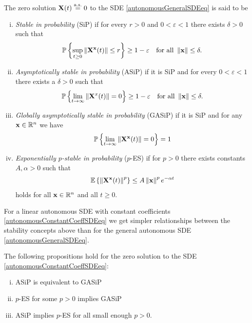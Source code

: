 \documentclass[a4paper,12pt,twoside,BCOR=10mm]{scrbook}
\begin{document}
\begin{definition}
The zero solution $\mathbf{X}(t) \stackrel{\text{a.s.}}{=} 0$ to the SDE \eqref{autonomousGeneralSDEeq} is said to be
\begin{enumerate}[i)]
    \item \textit{Stable in probability} (SiP) if for every $r > 0$ and $0 < \varepsilon < 1$ there exists $\delta > 0$ such that
    \begin{align*}
        \mathbb{P}\left\{\sup_{t\geq 0}\left\lVert\mathbf{X}^{\mathbf{x}}(t)\right\rVert\leq r\right\} \geq 1-\varepsilon \quad \text{for all } \left\lVert\mathbf{x}\right\rVert\leq \delta.
    \end{align*}
    \item \textit{Asymptotically stable in probability} (ASiP) if it is SiP and for every $0 < \varepsilon < 1$ there exists a $\delta > 0$ such that
    \begin{align*}
        \mathbb{P}\left\{\lim_{t\to \infty}\left\lVert\mathbf{X}^x(t)\right\rVert = 0\right\} \geq 1 - \varepsilon \quad \text{for all } \left\lVert\mathbf{x}\right\rVert\leq \delta.
    \end{align*}
    \item \textit{Globally asymptotically stable in probability} (GASiP) if it is SiP and for any $\mathbf{x} \in \mathbb{R}^{n}$ we have
    \begin{align*}
        \mathbb{P}\left\{\lim_{t\to \infty} \left\lVert\mathbf{X}^{\mathbf{x}}(t)\right\rVert = 0\right\} = 1
    \end{align*}
    \item \textit{Exponentially $p$-stable in probability} ($p$-ES) if for $p > 0$ there exists constants $A, \alpha > 0$ such that
    \begin{align*}
        \mathbb{E}\left\{\left\lVert\mathbf{X}^{\mathbf{x}}(t)\right\rVert^p \right\} \leq A\left\lVert\mathbf{x}\right\rVert^p e^{-\alpha t}
    \end{align*}
    holds for all $\mathbf{x} \in \mathbb{R}^{n}$ and all $t \geq 0$.
\end{enumerate}
\end{definition}

For a linear autonomous SDE with constant coefficients \eqref{autonomousConstantCoeffSDEeq} we get simpler relationships between the stability concepts above than for the general autonomous SDE \eqref{autonomousGeneralSDEeq}.

\begin{theorem}
    The following propositions hold for the zero solution to the SDE \eqref{autonomousConstantCoeffSDEeq}:
    
    \begin{enumerate}[i)]
        \item ASiP is equivalent to GASiP
        \item $p$-ES for some $p>0$ implies GASiP
        \item ASiP implies $p$-ES for all small enough $p>0$.
    \end{enumerate}
\end{theorem}
\end{document}
